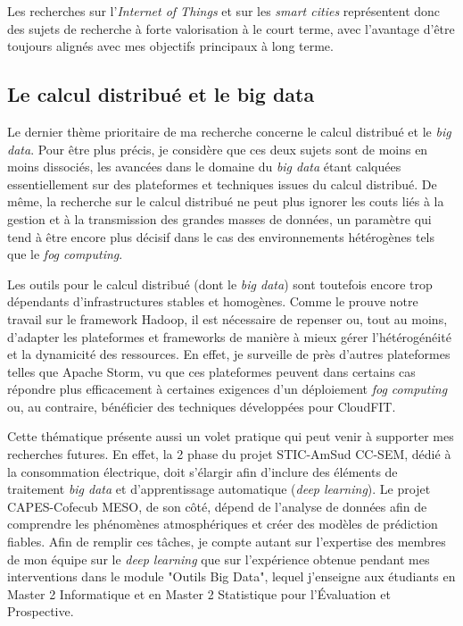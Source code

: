 Les recherches sur l'\textit{Internet of Things} et sur les \textit{smart cities} représentent donc des sujets de recherche à forte valorisation à le court terme, avec l'avantage d'être toujours alignés avec mes objectifs principaux à long terme. 

\subsection*{Le calcul distribué et le big data}

Le dernier thème prioritaire de ma recherche concerne le calcul distribué et le \textit{big data}. Pour être plus précis, je considère que ces deux sujets sont de moins en moins dissociés, les avancées dans le domaine du \textit{big data} étant calquées essentiellement sur des plateformes et techniques issues du calcul distribué. De même, la recherche sur le calcul distribué ne peut plus ignorer les couts liés à la gestion et à la transmission des grandes masses de données, un paramètre qui tend à être encore plus décisif dans le cas des environnements hétérogènes tels que le \textit{fog computing}. 

Les outils pour le calcul distribué (dont le \textit{big data}) sont toutefois encore trop dépendants d'infrastructures stables et homogènes. Comme le prouve notre travail sur le framework Hadoop, il est nécessaire de repenser ou, tout au moins, d'adapter les plateformes et frameworks de manière à mieux gérer l'hétérogénéité et la dynamicité des ressources. En effet, je surveille de près d'autres plateformes telles que Apache Storm, vu que ces plateformes peuvent dans certains cas répondre plus efficacement à certaines exigences d'un déploiement \textit{fog computing} ou, au contraire, bénéficier des techniques développées pour CloudFIT.

Cette thématique présente aussi un volet pratique qui peut venir à supporter mes recherches futures. En effet, la 2 phase du projet STIC-AmSud CC-SEM, dédié à la consommation électrique, doit s'élargir afin d'inclure des éléments de traitement \textit{big data} et d'apprentissage automatique (\textit{deep learning}). Le projet CAPES-Cofecub MESO, de son côté, dépend de l'analyse de données afin de comprendre les phénomènes atmosphériques et créer des modèles de prédiction fiables. Afin de remplir ces tâches, je compte autant sur l'expertise des membres de mon équipe sur le \textit{deep learning} que sur l'expérience obtenue pendant mes interventions dans le module "Outils Big Data", lequel j'enseigne aux étudiants en Master 2 Informatique et en Master 2 Statistique pour l'Évaluation et Prospective. 

